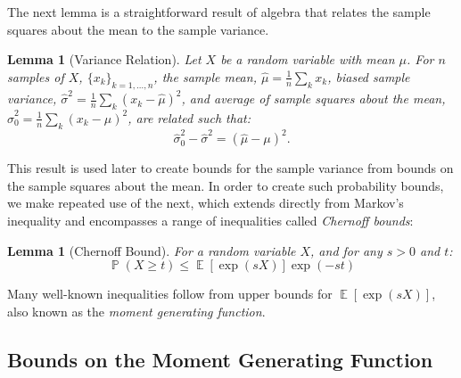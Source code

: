 \documentclass[]{interact}
\DeclareMathOperator{\E}{\mathbb{E}}
\DeclareMathOperator{\pr}{\mathbb{P}}
\theoremstyle{plain}%
\newtheorem{lemma}[Theorem]{Lemma}
\theoremstyle{definition}
\theoremstyle{remark}
\begin{document}
The next lemma is a straightforward result of algebra that relates the sample squares about the mean to the sample variance.
\begin{lemma}[Variance Relation]\label{variance1}
Let $X$ be a random variable with mean $\mu$. 
For $n$ samples of $X$, $\{x_k\}_{k=1,\ldots,n}$, 
the sample mean, $\hat{\mu}=\frac{1}{n}\sum_k x_k$, 
biased sample variance, $\hat{\sigma}^2=\frac{1}{n}\sum_k (x_k-\hat{\mu})^2$, 
and average of sample squares about the mean, $\hat{\sigma}_0^2 = \frac{1}{n}\sum_k (x_k-\mu)^2$, 
are related such that:
\[
\textstyle\hat{\sigma}_0^2-\hat{\sigma}^2 = \left(\hat{\mu}-\mu\right)^2.
\nonumber
\]
\end{lemma}
\noindent
This result is used later to create bounds for the sample variance from bounds on the sample squares about the mean.
In order to create such probability bounds, we make repeated use of the next, which extends directly from Markov's inequality and encompasses a range of inequalities called \textit{Chernoff bounds}:

\begin{lemma}[Chernoff Bound]\label{chernoff1}
For a random variable $X$, and for any $s>0$ and $t$:
\[
\textstyle\pr(X\ge t)\le\E\left[\exp(sX)\right]\exp(-st) 
\nonumber
\]
\end{lemma}
\noindent
Many well-known inequalities follow from upper bounds for $\E\left[\exp(sX)\right]$, also known as the \textit{moment generating function}.

\subsection{Bounds on the Moment Generating Function}\label{subsec:mgf}
\end{document}
